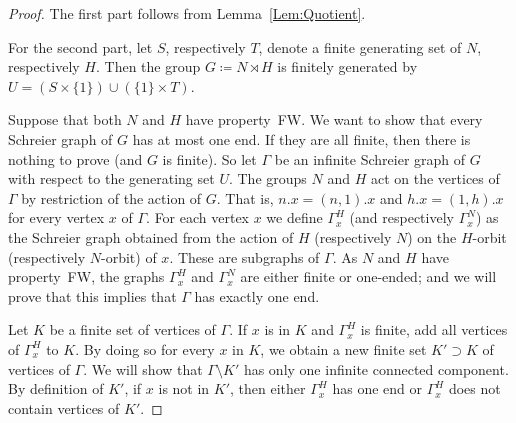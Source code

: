 \documentclass[a4paper]{article}
\theoremstyle{definition}
\theoremstyle{remark}
\begin{document}
%
%
\begin{proof}
The first part follows from Lemma~\ref{Lem:Quotient}.

For the second part, let $S$, respectively $T$, denote a finite generating set of $N$, respectively $H$.
Then the group $G\coloneqq N\rtimes H$ is finitely generated by $U=(S\times\{1\}) \cup(\{1\}\times T)$.


Suppose that both $N$ and $H$ have property~FW. We want to show that every Schreier graph of $G$ has at most one end. If they are all finite, then there is nothing to prove (and $G$ is finite). So let $\Gamma$ be an infinite Schreier graph of $G$ with respect to the generating set $U$. The groups $N$ and $H$ act on the vertices of $\Gamma$ by restriction of the action of $G$. That is, $n.x = (n,1).x$ and $h.x = (1,h).x$ for every vertex $x$ of $\Gamma$.
For each vertex $x$ we define $\Gamma_x^H$ (and respectively $\Gamma_x^N$) as the Schreier graph obtained from the action of $H$ (respectively $N$) on the $H$-orbit (respectively $N$-orbit) of $x$. These are subgraphs of $\Gamma$. As $N$ and $H$ have property~FW, the graphs $\Gamma_x^H$ and $\Gamma_x^N$ are either finite or one-ended; and we will prove that this implies that $\Gamma$ has exactly one end.

Let $K$ be a finite set of vertices of $\Gamma$.
If $x$ is in $K$ and $\Gamma_x^H$ is finite, add all vertices of $\Gamma_x^H$ to $K$.
By doing so for every $x$ in $K$, we obtain a new finite set $K' \supset K$ of vertices of $\Gamma$.
We will show that $\Gamma\setminus K'$ has only one infinite connected component.
By definition of $K'$, if $x$ is not in $K'$, then either $\Gamma_x^H$ has one end or $\Gamma_x^H$ does not contain vertices of $K'$.


\end{proof}
\end{document}
